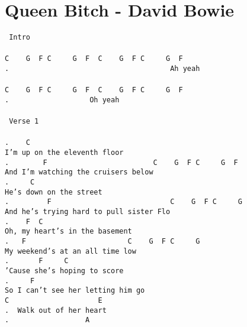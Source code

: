 \newpage
\section{Queen Bitch - David Bowie}
\label{Queen Bitch - David Bowie}
\label{Queen Bitch - David Bowie}
\texttt{\lbrack\ Intro\rbrack\\
\\
C\ \ \ \ G\ \ F\ C\ \ \ \ \ G\ \ F\ \ C\ \ \ \ G\ \ F\ C\ \ \ \ \ G\ \ F\\
. \ \ \ \ \ \ \ \ \ \ \ \ \ \ \ \ \ \ \ \ \ \ \ \ \ \ \ \ \ \ \ \ \ \ \ \ \ Ah\ yeah\\
\\
C\ \ \ \ G\ \ F\ C\ \ \ \ \ G\ \ F\ \ C\ \ \ \ G\ \ F\ C\ \ \ \ \ G\ \ F\\
. \ \ \ \ \ \ \ \ \ \ \ \ \ \ \ \ \ \ Oh\ yeah\\
\\
\lbrack\ Verse\ 1\rbrack\\
\\
. \ \ \ C\\
I'm\ up\ on\ the\ eleventh\ floor\\
. \ \ \ \ \ \ \ F\ \ \ \ \ \ \ \ \ \ \ \ \ \ \ \ \ \ \ \ \ \ \ \ \ C\ \ \ \ G\ \ F\ C\ \ \ \ \ G\ \ F\\
And\ I'm\ watching\ the\ cruisers\ below\\
. \ \ \ \ C\\
He's\ down\ on\ the\ street\\
. \ \ \ \ \ \ \ \ F\ \ \ \ \ \ \ \ \ \ \ \ \ \ \ \ \ \ \ \ \ \ \ \ \ \ \ \ C\ \ \ \ G\ \ F\ C\ \ \ \ \ G\\
And\ he's\ trying\ hard\ to\ pull\ sister\ Flo\\
. \ \ \ F\ \ C\\
Oh,\ my\ heart's\ in\ the\ basement\\
. \ \ F\ \ \ \ \ \ \ \ \ \ \ \ \ \ \ \ \ \ \ \ \ \ \ \ C\ \ \ \ G\ \ F\ C\ \ \ \ \ G\\
My\ weekend's\ at\ an\ all\ time\ low\\
. \ \ \ \ \ \ F\ \ \ \ \ C\\
'Cause\ she's\ hoping\ to\ score\\
. \ \ \ \ F\\
So\ I\ can't\ see\ her\ letting\ him\ go\\
C\ \ \ \ \ \ \ \ \ \ \ \ \ \ \ \ \ \ \ \ \ E\\
. \ Walk\ out\ of\ her\ heart\\
. \ \ \ \ \ \ \ \ \ \ \ \ \ \ \ \ \ A\\
}
